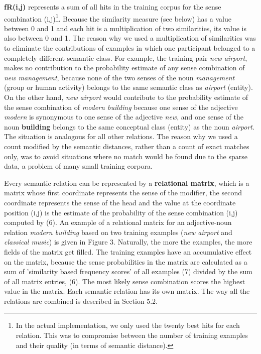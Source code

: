 {\bf fR(i,j)} represents a sum of all hits in the training corpus for the sense combination (i,j)\footnote{
In the actual implementation, we only used the twenty best hits for each relation. This was to compromise between the number of training examples and their quality (in terms of semantic distance).
}. Because the similarity measure (see below) has a value between 0 and 1 and each hit is a multiplication of two similarities, its value is also between 0 and 1. The reason why we used a multiplication of similarities was to eliminate the contributions of examples in which one participant belonged to a completely different semantic class. For example, the training pair {\it new airport}, makes no contribution to the probability estimate of any sense combination of {\it new management}, because none of the two senses of the noun {\it management} (group or human activity) belongs to the same semantic class as {\it airport} (entity). On the other hand, {\it new airport} would contribute to the probability estimate of the sense combination of {\it modern building} because one sense of the adjective {\it modern} is synonymous to one sense of the adjective {\it new}, and one sense of the noun {\bf building} belongs to the same conceptual class (entity) as the noun {\it airport}. The situation is analogous for all other relations. The reason why we used a count modified by the semantic distances, rather than a count of exact matches only, was to avoid situations where no match would be found due to the sparse data, a problem of many small training corpora.

Every semantic relation can be represented by a {\bf relational matrix}, which is a matrix whose first coordinate represents the sense of the modifier, the second coordinate represents the sense of the head and the value at the coordinate position (i,j) is the estimate of the probability of the sense combination (i,j) computed by (6). An example of a relational matrix for an adjective-noun relation {\it modern building} based on two training examples ({\it new airport} and {\it classical music}) is given in Figure 3. Naturally, the more the examples, the more fields of the matrix get filled. The training examples have an accumulative effect on the matrix, because the sense probabilities in the matrix are calculated as a sum of 'similarity based frequency scores' of all examples (7) divided by the sum of all matrix entries, (6). The most likely sense combination scores the highest value in the matrix. Each semantic relation has its own matrix. The way all the relations are combined is described in Section 5.2.

